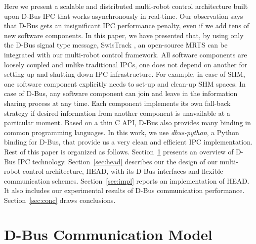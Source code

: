 \documentclass[draft]{ifacconf}
\begin{document}
Here we present a scalable and distributed multi-robot control architecture built upon D-Bus IPC that works asynchronously in real-time. Our observation says that D-Bus gets an insignificant IPC performance penalty, even if we add tens of new software components. In this paper, we have presented that, by using only the D-Bus signal type message, SwisTrack \citep{Lochmatter+2008}, an open-source MRTS can be integrated with our multi-robot control framework. All software components are loosely coupled and unlike traditional IPCs, one does not depend on another for setting up and shutting down IPC infrastructure. For example, in case of SHM, one software component explicitly needs to set-up and clean-up SHM spaces. In case of D-Bus, any software component can join and leave in the information sharing process at any time. Each component implements its own fall-back strategy if desired information from another component is unavailable at a particular moment. Based on a thin C API, D-Bus also provides many binding in common programming languages. In this work, we use {\em dbus-python}, a Python binding for D-Bus, that provide us a very clean and efficient IPC implementation.\\
Rest of this paper is organized as follows. Section~\ref{sec:dbus} presents an overview of D-Bus IPC technology.  Section~\ref{sec:head} describes our the design of our multi-robot control architecture, HEAD, with its D-Bus interfaces and flexible communication schemes.  Section~\ref{sec:impl} reports an implementation of HEAD. It also includes  our experimental results of D-Bus communication performance. Section~\ref{sec:conc} draws conclusions.
\section{D-Bus Communication Model}
\label{sec:dbus}
\end{document}
